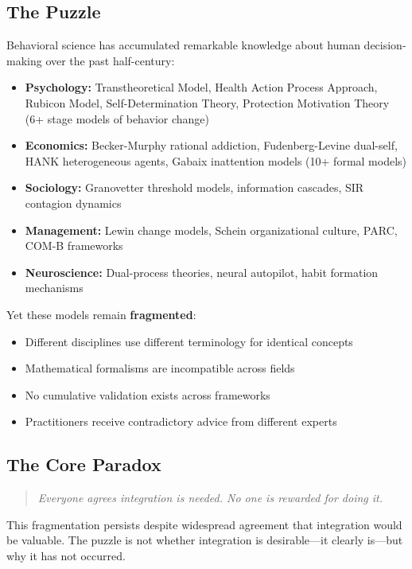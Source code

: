 \documentclass[12pt,a4paper]{article}
\begin{document}
\subsection{The Puzzle}

Behavioral science has accumulated remarkable knowledge about human decision-making over the past half-century:

\begin{itemize}
\item \textbf{Psychology:} Transtheoretical Model, Health Action Process Approach, Rubicon Model, Self-Determination Theory, Protection Motivation Theory (6+ stage models of behavior change)
\item \textbf{Economics:} Becker-Murphy rational addiction, Fudenberg-Levine dual-self, HANK heterogeneous agents, Gabaix inattention models (10+ formal models)
\item \textbf{Sociology:} Granovetter threshold models, information cascades, SIR contagion dynamics
\item \textbf{Management:} Lewin change models, Schein organizational culture, PARC, COM-B frameworks
\item \textbf{Neuroscience:} Dual-process theories, neural autopilot, habit formation mechanisms
\end{itemize}

Yet these models remain \textbf{fragmented}:
\begin{itemize}
\item Different disciplines use different terminology for identical concepts
\item Mathematical formalisms are incompatible across fields
\item No cumulative validation exists across frameworks
\item Practitioners receive contradictory advice from different experts
\end{itemize}

\subsection{The Core Paradox}

\begin{quote}
\textit{Everyone agrees integration is needed. No one is rewarded for doing it.}
\end{quote}

This fragmentation persists despite widespread agreement that integration would be valuable. The puzzle is not whether integration is desirable---it clearly is---but why it has not occurred.
\end{document}
